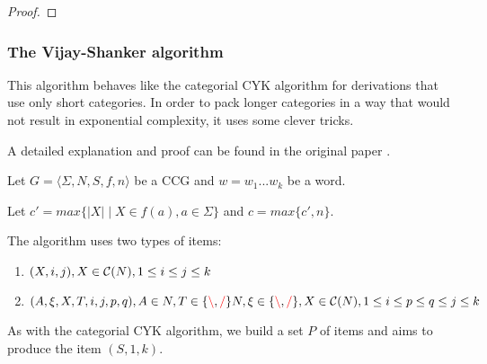 \documentclass[main.tex]{subfiles}
\begin{document}
\begin{proof}
\end{proof}

\subsubsection{The Vijay-Shanker algorithm}

This algorithm behaves like the categorial CYK algorithm for derivations that use only
short categories. In order to pack longer categories in a way that would not
result in exponential complexity, it uses some clever tricks.

A detailed explanation and proof can be found in the original paper \cite{shanker}.

Let $ G = \langle \Sigma, N, S, f, n \rangle $ be a CCG and $w = w_1 ... w_k$
be a word.

Let $c' = max \{ |X| \mid X \in f(a), a \in \Sigma \}$ and $c = max \{ c', n \}$.

The algorithm uses two types of items:
\begin{enumerate}
    \item $(X, i, j), X \in \mathcal{C}( N ), 1 \leq i \leq j \leq k$
    \item $(A, \xi, X, T, i, j, p, q), A \in N, T \in \{ \textcolor{red}{\backslash}, \textcolor{red}{/} \} N, \xi \in \{ \textcolor{red}{\backslash}, \textcolor{red}{/} \}, X \in \mathcal{C}( N ), 1 \leq i \leq p \leq q \leq j \leq k$
\end{enumerate}

As with the categorial CYK algorithm, we build a set ${P}$ of items and aims to produce the item
$(S, 1, k)$.
\end{document}
